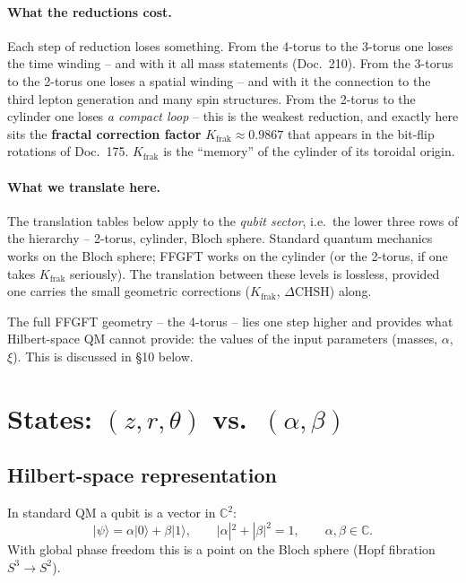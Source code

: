 \paragraph{What the reductions cost.}
Each step of reduction loses something. From the 4-torus to the
3-torus one loses the time winding -- and with it all mass
statements (Doc.~210). From the 3-torus to the 2-torus one loses a
spatial winding -- and with it the connection to the third lepton
generation and many spin structures. From the 2-torus to the
cylinder one loses \emph{a compact loop} -- this is the weakest
reduction, and exactly here sits the \textbf{fractal correction
factor} $K_{\text{frak}} \approx 0.9867$ that appears in the
bit-flip rotations of Doc.~175. $K_{\text{frak}}$ is the
\enquote{memory} of the cylinder of its toroidal origin.

\paragraph{What we translate here.}
The translation tables below apply to the \emph{qubit sector},
i.e.\ the lower three rows of the hierarchy -- 2-torus, cylinder,
Bloch sphere. Standard quantum mechanics works on the Bloch
sphere; FFGFT works on the cylinder (or the 2-torus, if one takes
$K_{\text{frak}}$ seriously). The translation between these levels
is lossless, provided one carries the small geometric corrections
($K_{\text{frak}}$, $\Delta\text{CHSH}$) along.

The full FFGFT geometry -- the 4-torus -- lies one step higher and
provides what Hilbert-space QM cannot provide: the values of the
input parameters (masses, $\alpha$, $\xi$). This is discussed in
§10 below.

\section{\texorpdfstring{States: $(z, r, \theta)$ vs.\ $(\alpha, \beta)$}{States: (z,r,theta) vs. (alpha,beta)}}

\subsection{Hilbert-space representation}

In standard QM a qubit is a vector in $\mathbb{C}^2$:
\begin{equation}
  |\psi\rangle = \alpha|0\rangle + \beta|1\rangle,
  \qquad
  |\alpha|^2 + |\beta|^2 = 1,
  \qquad
  \alpha, \beta \in \mathbb{C}.
\end{equation}
With global phase freedom this is a point on the Bloch sphere
(Hopf fibration $S^3 \to S^2$).

